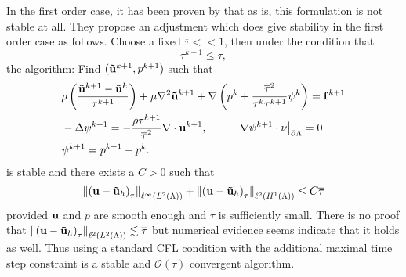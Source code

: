 \documentclass[letterpaper]{erdc}
\begin{document}
In the first order case, it has been proven by \cite{bonito2015modified} that as is, this formulation is not stable at all.  They propose an adjustment which does give stability in the first order case as follows.  Choose a fixed $\overline{\tau}<<1$, then under the condition that 
\begin{equation}
  \tau^{k+1} \leq \overline{\tau},
\end{equation}
the algorithm: Find $(\mathbf{\tilde{u}}^{k+1},p^{k+1})$ such that
\begin{align}
  &\rho\left( \frac{\mathbf{\tilde{u}}^{k+1} - \mathbf{\tilde{u}}^{k}}{\tau^{k+1}} \right) + \mu\nabla^2 \mathbf{\tilde{u}}^{k+1} + \nabla\left( p^{k} + \frac{\overline{\tau}^2}{\tau^{k}\tau^{k+1}}\psi^{k}\right) = \mathbf{f}^{k+1}\label{eq:newnewadaptivevelocitybdf1}\\
  &-\Delta \psi^{k+1} = -\frac{\rho\tau^{k+1}}{\overline{\tau}^2}\nabla\cdot\textbf{u}^{k+1}, \hspace{1cm} \left.\nabla\psi^{k+1}\cdot\nu\right|_{\partial\Lambda} = 0 \label{eq:newnewadaptivepressurecorrectionbdf1}\\
  & \psi^{k+1} = p^{k+1} - p^{k}.
\end{align}
is stable and there exists a $C>0$ such that
\begin{equation}
\left\| \left( \textbf{u} - \mathbf{\tilde{u}}_h \right)_{\tau} \right\|_{\ell^{\infty}(L^2(\Lambda))} + \left\| \left(\textbf{u} - \mathbf{\tilde{u}}_h\right)_{\tau} \right\|_{\ell^{2}(H^1(\Lambda))} \leq C \overline{\tau}
\end{equation}
provided $\textbf{u}$ and $p$ are smooth enough and $\tau$ is sufficiently small.  There is no proof that $\left\| \left( \textbf{u} - \mathbf{\tilde{u}}_h \right)_{\tau} \right\|_{\ell^{2}(L^2(\Lambda))} \lesssim \overline{\tau}$ but numerical evidence seems indicate that it holds as well.  Thus using a standard CFL condition with the additional maximal time step constraint is a stable and $\mathcal{O}(\overline{\tau})$ convergent algorithm.


%
%
\end{document}
